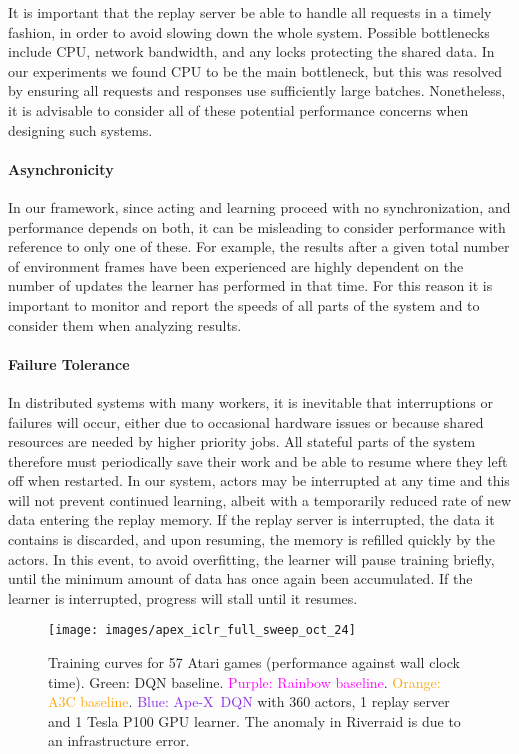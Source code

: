 \documentclass{article} \PassOptionsToPackage{usenames,dvipsnames}{xcolor}
\def\apex{Ape-X}
\def\smallcaption#1{\caption{\small #1}\vspace{-0.4cm}}
\begin{document}
It is important that the replay server be able to handle all requests in a timely fashion, in order to avoid slowing down the whole system. Possible bottlenecks include CPU, network bandwidth, and any locks protecting the shared data. In our experiments we found CPU to be the main bottleneck, but this was resolved by ensuring all requests and responses use sufficiently large batches. Nonetheless, it is advisable to consider all of these potential performance concerns when designing such systems.

\paragraph{Asynchronicity}

In our framework, since acting and learning proceed with no synchronization, and performance depends on both, it can be misleading to consider performance with reference to only one of these. For example, the results after a given total number of environment frames have been experienced are highly dependent on the number of updates the learner has performed in that time. For this reason it is important to monitor and report the speeds of all parts of the system and to consider them when analyzing results.

\paragraph{Failure Tolerance}

In distributed systems with many workers, it is inevitable that interruptions or failures will occur, either due to occasional hardware issues or because shared resources are needed by higher priority jobs. All stateful parts of the system therefore must periodically save their work and be able to resume where they left off when restarted. In our system, actors may be interrupted at any time and this will not prevent continued learning, albeit with a temporarily reduced rate of new data entering the replay memory. If the replay server is interrupted, the data it contains is discarded, and upon resuming, the memory is refilled quickly by the actors. In this event, to avoid overfitting, the learner will pause training briefly, until the minimum amount of data has once again been accumulated. If the learner is interrupted, progress will stall until it resumes.


\begin{figure}
    \centering
    \texttt{[image: images/apex\_iclr\_full\_sweep\_oct\_24]}
    \smallcaption{Training curves for 57 Atari games (performance against wall clock time). \textcolor{OliveGreen}{Green: DQN baseline}. \textcolor{Fuchsia}{Purple: Rainbow baseline}. \textcolor{orange}{Orange: A3C baseline}. \textcolor{BlueViolet}{Blue: \apex\ DQN} with 360 actors, 1 replay server and 1 Tesla P100 GPU learner. The anomaly in Riverraid is due to an infrastructure error.}
    \label{fig:atari_57_games}
\end{figure}
\end{document}
